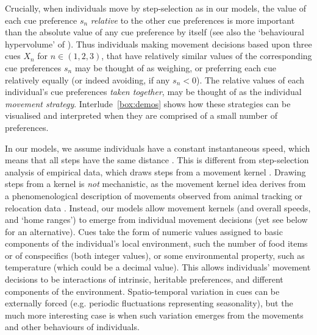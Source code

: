 \medskip

Crucially, when individuals move by step-selection as in our models, the value of each cue preference $s_{n}$ \textit{relative} to the other cue preferences is more important than the absolute value of any cue preference by itself (see also the `behavioural hypervolume' of \cite{bastille-rousseau2019}).
Thus individuals making movement decisions based upon three cues $X_n$ for $n \in (1, 2, 3)$, that have relatively similar values of the corresponding cue preferences $s_n$ may be thought of as weighing, or preferring each cue relatively equally (or indeed avoiding, if any $s_n < 0$).
The relative values of each individual's cue preferences \textit{taken together}, may be thought of as the individual \textit{movement strategy}.
Interlude~\ref{box:demos} shows how these strategies can be visualised and interpreted when they are comprised of a small number of preferences.

In our models, we assume individuals have a constant instantaneous speed, which means that all steps have the same distance \parencite[see a similar implementation in][]{spiegel2017}.
This is different from step-selection analysis of empirical data, which draws steps from a movement kernel \parencite{fortin2005,manly2002,avgar2016}.
Drawing steps from a kernel \parencite*[see e.g.][]{white2018} is \textit{not} mechanistic, as the movement kernel idea derives from a phenomenological description of movements observed from animal tracking or relocation data \parencite{fortin2005}.
Instead, our models allow movement kernels (and overall speeds, and `home ranges') to emerge from individual movement decisions (yet see below for an alternative).
Cues take the form of numeric values assigned to basic components of the individual's local environment, such the number of food items or of conspecifics (both integer values), or some environmental property, such as temperature (which could be a decimal value).
This allows individuals' movement decisions to be interactions of intrinsic, heritable preferences, and different components of the environment.
Spatio-temporal variation in cues can be externally forced (e.g. periodic fluctuations representing seasonality), but the much more interesting case is when such variation emerges from the movements and other behaviours of individuals.


